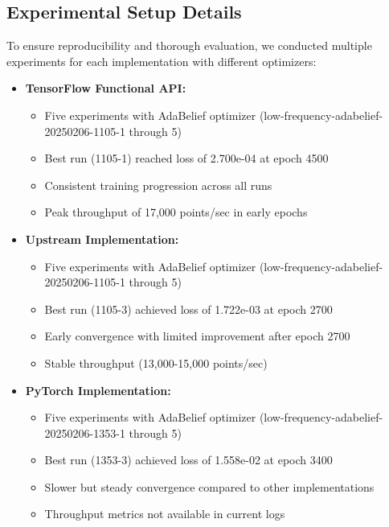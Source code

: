 \documentclass[10pt,journal,compsoc,onecolumn]{IEEEtran}
\begin{document}
\subsection{Experimental Setup Details}
To ensure reproducibility and thorough evaluation, we conducted multiple experiments for each implementation with different optimizers:

\begin{itemize}
    \item \textbf{TensorFlow Functional API:}
    \begin{itemize}
        \item Five experiments with AdaBelief optimizer (low-frequency-adabelief-20250206-1105-1 through 5)
        \item Best run (1105-1) reached loss of 2.700e-04 at epoch 4500
        \item Consistent training progression across all runs
        \item Peak throughput of 17,000 points/sec in early epochs
    \end{itemize}
    
    \item \textbf{Upstream Implementation:}
    \begin{itemize}
        \item Five experiments with AdaBelief optimizer (low-frequency-adabelief-20250206-1105-1 through 5)
        \item Best run (1105-3) achieved loss of 1.722e-03 at epoch 2700
        \item Early convergence with limited improvement after epoch 2700
        \item Stable throughput (13,000-15,000 points/sec)
    \end{itemize}
    
    \item \textbf{PyTorch Implementation:}
    \begin{itemize}
        \item Five experiments with AdaBelief optimizer (low-frequency-adabelief-20250206-1353-1 through 5)
        \item Best run (1353-3) achieved loss of 1.558e-02 at epoch 3400
        \item Slower but steady convergence compared to other implementations
        \item Throughput metrics not available in current logs
    \end{itemize}
\end{itemize}
\end{document}
